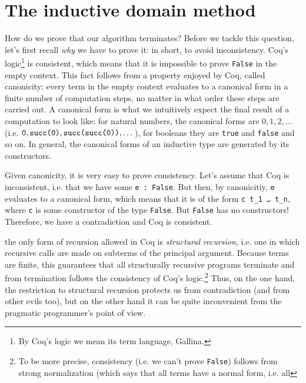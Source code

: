 \documentclass[declaration,mgr,english,shortabstract]{iithesis}
\newcommand{\m}[1]{\texttt{#1}}
\newcommand{\suc}[1]{\m{succ}(#1)}
\begin{document}
\section{The inductive domain method} \label{inductivedomain}

How do we prove that our algorithm terminates? Before we tackle this question, let's first recall \textit{why} we have to prove it: in short, to avoid inconsistency. Coq's logic\footnote{By Coq's logic we mean its term language, Gallina.} is consistent, which means that it is impossible to prove \m{False} in the empty context. This fact follows from a property enjoyed by Coq, called canonicity: every term in the empty context evaluates to a canonical form in a finite number of computation steps, no matter in what order these steps are carried out. A canonical form is what we intuitively expect the final result of a computation to look like: for natural numbers, the canonical forms are $0, 1, 2, \dots$ (i.e. $\m{0}, \m{\suc{0}}, \m{\suc{\suc{0}}}, \dots$), for booleans they are \m{true} and \m{false} and so on. In general, the canonical forms of an inductive type are generated by its constructors.

Given canonicity, it is very easy to prove consistency. Let's assume that Coq is inconsistent, i.e. that we have some \m{e :\ False}. But then, by canonicitiy, \m{e} evaluates to a canonical form, which means that it is of the form \m{c t\_1\ \dots\ t\_n}, where \m{c} is some constructor of the type \m{False}. But \m{False} has no constructors! Therefore, we have a contradiction and Coq is consistent.




the only form of recursion allowed in Coq is \textit{structural recursion}, i.e. one in which recursive calls are made on subterms of the principal argument. Because terms are finite, this guarantees that all structurally recursive programs terminate and from termination follows the consistency of Coq's logic.\footnote{To be more precise, consistency (i.e. we can't prove \m{False}) follows from strong normalization (which says that all terms have a normal form, i.e. all } Thus, on the one hand, the restriction to structural recursion protects us from contradiction (and from other evils too), but on the other hand it can be quite inconvenient from the pragmatic programmer's point of view.
\end{document}
